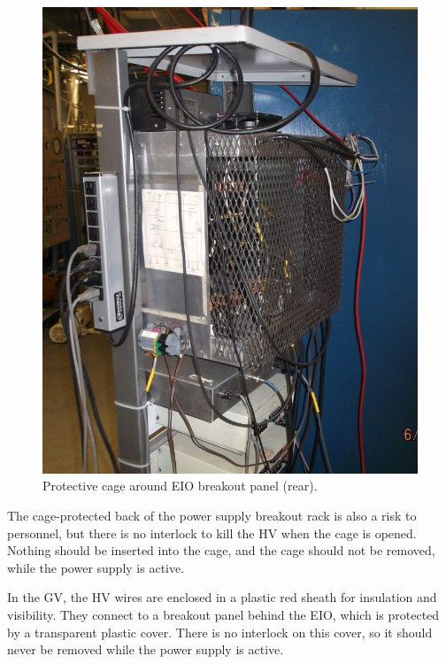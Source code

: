 \begin{figure}[htbp!]
\begin{minipage}{0.45\textwidth}
   \includegraphics[width=\textwidth]{./img/hv-safety-cage.jpg}
   \caption{Protective cage around EIO breakout panel (rear).}
 \label{fig:hv-safety-cage}
  \end{minipage}
\end{figure}


The cage-protected back of the power supply breakout rack is also a risk to personnel, but there is no interlock to kill the HV when the cage is opened.  Nothing should be inserted into the cage, and the cage should not be removed, while the power supply is active.

In the GV, the HV wires are enclosed in a plastic red sheath for insulation and visibility.  They connect to a breakout panel behind the EIO, which is protected by a transparent plastic cover.  There is no interlock on this cover, so it should never be removed while the power supply is active.

